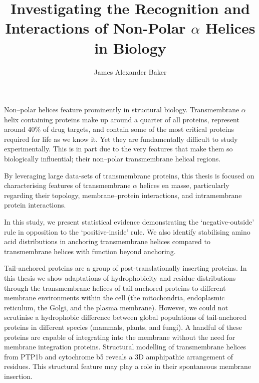 \documentclass[12pt,PhD,twoside]{muthesis}
\begin{document}
\sloppy

\title{Investigating the Recognition and Interactions of Non-Polar \(\alpha\) Helices in Biology}
\author{James Alexander Baker}
\def\wordcount{63,689}






\beforeabstract{} %


Non\---polar helices feature prominently in structural biology.
Transmembrane \(\alpha\) helix containing proteins make up around a quarter of all proteins, represent around 40\% of drug targets, and contain some of the most critical proteins required for life as we know it.
Yet they are fundamentally difficult to study experimentally.
This is in part due to the very features that make them so biologically influential; their non\---polar transmembrane helical regions.

By leveraging large data-sets of transmembrane proteins, this thesis is focused on characterising features of transmembrane \(\alpha\) helices en masse, particularly regarding their topology, membrane\---protein interactions, and intramembrane protein interactions.

In this study, we present statistical evidence demonstrating the `negative\--outside' rule in opposition to the `positive\--inside' rule.
We also identify stabilising amino acid distributions in anchoring transmembrane helices compared to transmembrane helices with function beyond anchoring.

Tail\--anchored proteins are a group of post\--translationally inserting proteins.
In this thesis we show adaptations of hydrophobicity and residue distributions through the transmembrane helices of tail\--anchored proteins to different membrane environments within the cell (the mitochondria, endoplasmic reticulum, the Golgi, and the plasma membrane).
However, we could not scrutinise a hydrophobic difference between global populations of tail\--anchored proteins in different species (mammals, plants, and fungi).
A handful of these proteins are capable of integrating into the membrane without the need for membrane integration proteins.
Structural modelling of transmembrane helices from PTP1b and cytochrome b5 reveals a 3D amphipathic arrangement of residues.
This structural feature may play a role in their spontaneous membrane insertion.
\end{document}
